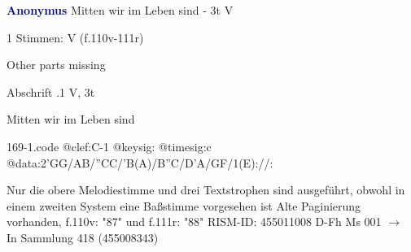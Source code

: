 \documentclass[twocolumn]{book}
\begin{document}
\newline \par \vspace{7pt} \textcolor{darkblue}{\textbf{Anonymus  }}
\newline Mitten wir im Leben sind - 3t
\newline V
\newline \begin{itshape}\end{itshape} 
\newline \textcolor{darkblue}{}  1 Stimmen: V  (f.110v-111r)
\newline \begin{small} Other parts missing\end{small} 
\newline Abschrift
.1  V, 3t
\newline \begin{footnotesize} Mitten wir im Leben sind \end{footnotesize}  
\begin{filecontents*}{169-1.code}
@clef:C-1
@keysig:
@timesig:c
@data:2'GG/AB/''CC/'B(A)/B''C/D'A/GF/1(E)://:
\end{filecontents*}
\newline
%
\newline Nur die obere Melodiestimme und drei Textstrophen sind ausgeführt, obwohl in einem zweiten System eine Baßstimme vorgesehen ist
\newline Alte Paginierung vorhanden, f.110v: "87" und f.111r: "88"
\newline RISM-ID: 455011008
\newline D-Fh  Ms 001
\newline $\rightarrow$ In Sammlung 418 (455008343)
      
\end{document}
